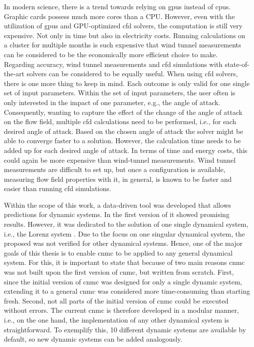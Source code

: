 In modern science, there is a trend towards relying on \glspl{gpu} instead of \glspl{cpu}. Graphic cards possess much 
more cores than a CPU. However, even with the utilization of \glspl{gpu} and GPU-optimized \gls{cfd} solvers, the computation is still very expensive. Not only in time but also 
in electricity costs. 
Running calculations on a cluster for multiple months is such expensive that wind tunnel measurements can be considered to be the economically more
efficient choice to make.
Regarding accuracy, wind tunnel measurements and \gls{cfd} simulations with state-of-the-art solvers can be considered to be 
equally useful. When using \gls{cfd} solvers, there is one more thing to keep 
in mind. 
Each outcome is only valid for one single set of input parameters.
Within the set of input parameters, the user often is only interested 
in the impact of one parameter, e.g., the angle of attack. Consequently,
wanting to capture the effect of the change of the angle of attack on the flow field, 
multiple \gls{cfd} calculations need to be performed, i.e., for each desired 
angle of attack.
Based on the chosen angle of attack the solver might be able to converge faster to a solution. However, the calculation time 
needs to be added up for each desired angle of attack. 
In terms of time and energy costs, this could again be more expensive than wind-tunnel
measurements. Wind tunnel measurements are difficult to set up, but once a 
configuration is available, measuring flow field properties with it, in general, is known to be faster and easier than running \gls{cfd} simulations.\newline 

Within the scope of this work, a data-driven tool was developed that allows predictions for dynamic systems. 
In \cite{Max2021} the first version of it showed promising results. 
However, it was dedicated to the solution of one single dynamical system, i.e., the Lorenz system \cite{lorenz1963deterministic}.
Due to the focus on one singular dynamical system, the proposed  was not verified for other dynamical systems.
Hence, one of the major goals of this thesis is to enable \gls{cnmc} to be applied to any general dynamical system. 
For this, it is important to state that because of two main reasons \gls{cnmc} was not built upon the first version of \gls{cnmc}, but written from scratch.
First, since the initial version of \gls{cnmc} was designed for only a single dynamic system, extending it to a general \gls{cnmc} was considered more time-consuming than starting fresh.
Second, not all parts of the initial version of \gls{cnmc} could be executed without errors.
The current \gls{cnmc} is therefore developed in a modular manner, i.e., on the one hand, the implementation of any other dynamical system is straightforward. 
To exemplify this, 10 different dynamic systems are available by default, so new dynamic systems can be added analogously.\newline 

